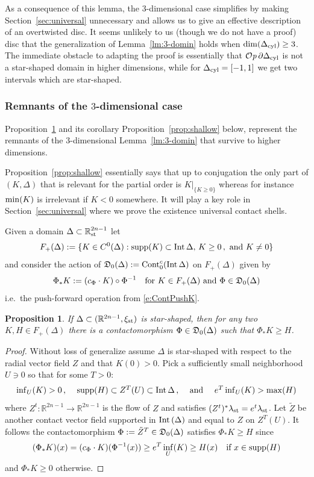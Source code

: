 \documentclass[12pt]{paper}
\theoremstyle{plain}
\newtheorem{prop}[theorem]{Proposition}
\theoremstyle{definition}
\newcommand{\p}{\partial}
\newcommand{\R}{{\mathbb{R}}}
\newcommand{\st}{{\rm st}}
\newcommand{\cyl}{{\rm cyl}}
\newcommand{\Int}{{\rm Int\,}} %
\renewcommand{\min}{{\rm min}}
\renewcommand{\max}{{\rm max}}
\newcommand{\supp}{{\rm supp}}
\newcommand{\cD}{{\frak D}}
\def\Op{{\mathcal O}{\it p}\,}
\numberwithin{figure}{section}
\begin{document}
As a consequence of this lemma, the $3$-dimensional case simplifies by making Section~\ref{sec:universal} unnecessary
and allows us to give an effective description of an overtwisted disc.  It seems unlikely to us (though we do not have a proof) disc that
the generalization of Lemma~\ref{lm:3-domin} holds when $\dim(\Delta_{\cyl}) \geq 3$.  The immediate obstacle to adapting the proof 
is essentially that  $\Op\p\Delta_{\cyl}$  is not a star-shaped domain in higher dimensions, while for $\Delta_\cyl = [-1, 1]$ we get two intervals which are star-shaped.

\subsubsection{Remnants of the $3$-dimensional case}\label{ssec:disorder}

Proposition~\ref{prop:disorder} and its corollary Proposition~\ref{prop:shallow} below,
represent the remnants of the $3$-dimensional Lemma~\ref{lm:3-domin} that survive to higher dimensions.


Proposition~\ref{prop:shallow} essentially says that up to conjugation the only part of $(K, \Delta)$ that is relevant for the partial order is $K|_{\{K \geq 0\}}$ whereas for instance $\min(K)$ is irrelevant if $K < 0$ somewhere.
It will play a key role in Section~\ref{sec:universal}  
where we prove the existence universal contact shells.



Given a domain $\Delta\subset\R^{2n-1}_\st$ let 
$$
	F_+(\Delta) := \{K \in C^0(\Delta): \supp(K) \subset \Int \Delta,\, K \geq 0\,, \mbox{ and } K \not= 0\}
$$ 
and consider the action of $\cD_0(\Delta):=\mbox{Cont}^c_0(\Int\Delta)$ on $F_+(\Delta)$ given by
$$
	\Phi_*K :=(c_{\Phi} \cdot K) \circ \Phi^{-1} \quad\mbox{for $K\in F_+(\Delta)$ and $\Phi\in\cD_0(\Delta)$}
$$
i.e.\ the push-forward operation from \eqref{e:ContPushK}.

 \begin{prop}\label{prop:disorder}
 If $\Delta \subset (\R^{2n-1}, \xi_{\st})$ is star-shaped, then for any two $K, H\in F_+(\Delta)$ there is a contactomorphism 
 $\Phi\in\cD_0(\Delta)$ such that $\Phi_*K\geq H$.
 \end{prop}
 \begin{proof}
 Without loss of generalize assume $\Delta$ is star-shaped with respect to the radial vector field 
 $Z$ and that $K(0) > 0$.  Pick a sufficiently small neighborhood $U \ni 0$ so that for some $T >0$:
 $$
 	\mbox{$\inf_U(K) > 0$\,, \quad $\supp(H) \subset Z^T(U)\subset\Int \Delta$\,, \quad and \quad $e^T \inf_U(K) > \max(H)$}
$$
where $Z^t:\R^{2n-1}\to\R^{2n-1}$ is the flow of $Z$ and satisfies $(Z^t)^*\lambda_{\st} = e^t \lambda_{\st}$.
Let $\tilde{Z}$ be another contact vector field supported in $\Int(\Delta)$ and equal to $Z$ on $Z^T(U)$.
It follows the contactomorphism $\Phi := \tilde{Z}^T \in \cD_0(\Delta)$ satisfies $\Phi_* K \geq H$ since
$$
	(\Phi_*K)(x) = (c_\Phi \cdot K)(\Phi^{-1}(x)) \geq e^T \inf_U(K) \geq H(x) \quad\mbox{if $x \in \supp(H)$}
$$
and $\Phi_*K \geq 0$ otherwise.
 \end{proof}
 
\end{document}
